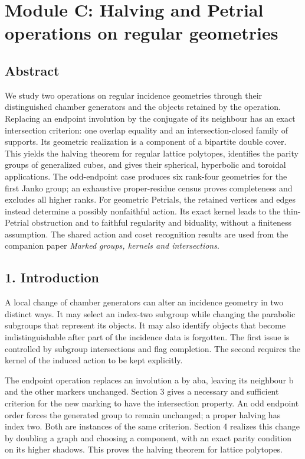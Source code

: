 \documentclass[
  11pt,
  a4paper,
]{article}
\author{}
\date{}
\begin{document}
\section{Module C: Halving and Petrial operations on regular
geometries}\label{module-c-halving-and-petrial-operations-on-regular-geometries}

\subsection{Abstract}\label{abstract}

We study two operations on regular incidence geometries through their
distinguished chamber generators and the objects retained by the
operation. Replacing an endpoint involution by the conjugate of its
neighbour has an exact intersection criterion: one overlap equality and
an intersection-closed family of supports. Its geometric realization is
a component of a bipartite double cover. This yields the halving theorem
for regular lattice polytopes, identifies the parity groups of
generalized cubes, and gives their spherical, hyperbolic and toroidal
applications. The odd-endpoint case produces six rank-four geometries
for the first Janko group; an exhaustive proper-residue census proves
completeness and excludes all higher ranks. For geometric Petrials, the
retained vertices and edges instead determine a possibly nonfaithful
action. Its exact kernel leads to the thin-Petrial obstruction and to
faithful regularity and biduality, without a finiteness assumption. The
shared action and coset recognition results are used from the companion
paper \emph{Marked groups, kernels and intersections}.

\subsection{1. Introduction}\label{introduction}

A local change of chamber generators can alter an incidence geometry in
two distinct ways. It may select an index-two subgroup while changing
the parabolic subgroups that represent its objects. It may also identify
objects that become indistinguishable after part of the incidence data
is forgotten. The first issue is controlled by subgroup intersections
and flag completion. The second requires the kernel of the induced
action to be kept explicitly.

The endpoint operation replaces an involution a by aba, leaving its
neighbour b and the other markers unchanged. Section 3 gives a necessary
and sufficient criterion for the new marking to have the intersection
property. An odd endpoint order forces the generated group to remain
unchanged; a proper halving has index two. Both are instances of the
same criterion. Section 4 realizes this change by doubling a graph and
choosing a component, with an exact parity condition on its higher
shadows. This proves the halving theorem for lattice polytopes.
\end{document}
